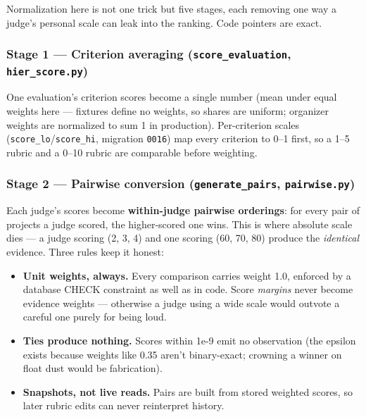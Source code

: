 \documentclass[
  11pt,
]{article}
\providecommand{\tightlist}{%
  \setlength{\itemsep}{0pt}\setlength{\parskip}{0pt}}
\begin{document}
Normalization here is not one trick but five stages, each removing one
way a judge's personal scale can leak into the ranking. Code pointers
are exact.

\hypertarget{stage-1-criterion-averaging-score_evaluation-hier_score.py}{%
\subsubsection{\texorpdfstring{Stage 1 --- Criterion averaging
(\texttt{score\_evaluation},
\texttt{hier\_score.py})}{Stage 1 --- Criterion averaging (score\_evaluation, hier\_score.py)}}\label{stage-1-criterion-averaging-score_evaluation-hier_score.py}}

One evaluation's criterion scores become a single number (mean under
equal weights here --- fixtures define no weights, so shares are
uniform; organizer weights are normalized to sum 1 in production).
Per-criterion scales (\texttt{score\_lo}/\texttt{score\_hi}, migration
\texttt{0016}) map every criterion to 0--1 first, so a 1--5 rubric and a
0--10 rubric are comparable before weighting.

\hypertarget{stage-2-pairwise-conversion-generate_pairs-pairwise.py}{%
\subsubsection{\texorpdfstring{Stage 2 --- Pairwise conversion
(\texttt{generate\_pairs},
\texttt{pairwise.py})}{Stage 2 --- Pairwise conversion (generate\_pairs, pairwise.py)}}\label{stage-2-pairwise-conversion-generate_pairs-pairwise.py}}

Each judge's scores become \textbf{within-judge pairwise orderings}: for
every pair of projects a judge scored, the higher-scored one wins. This
is where absolute scale dies --- a judge scoring (2, 3, 4) and one
scoring (60, 70, 80) produce the \emph{identical} evidence. Three rules
keep it honest:

\begin{itemize}
\tightlist
\item
  \textbf{Unit weights, always.} Every comparison carries weight 1.0,
  enforced by a database CHECK constraint as well as in code. Score
  \emph{margins} never become evidence weights --- otherwise a judge
  using a wide scale would outvote a careful one purely for being loud.
\item
  \textbf{Ties produce nothing.} Scores within 1e-9 emit no observation
  (the epsilon exists because weights like 0.35 aren't binary-exact;
  crowning a winner on float dust would be fabrication).
\item
  \textbf{Snapshots, not live reads.} Pairs are built from stored
  weighted scores, so later rubric edits can never reinterpret history.
\end{itemize}
\end{document}
